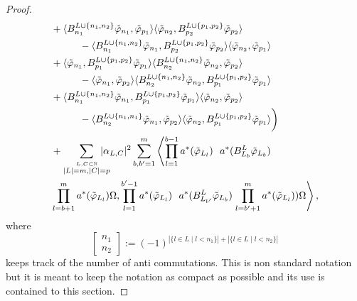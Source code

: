 \documentclass[b5paper,draft,openbib,12pt]{memoir}
\begin{document}
\begin{proof}
\begin{align}
  &+\langle B^{L\cup\{n_1,n_2\}}_{n_1}\tilde{\varphi}_{n_1},\tilde{\varphi}_{p_1} \rangle \langle  \tilde{\varphi}_{n_2}, B^{L\cup\{p_1,p_2\}}_{p_2}\tilde{\varphi}_{p_2}\rangle\\
  &\hspace{1cm}-\langle B^{L\cup\{n_1,n_2\}}_{n_1} \tilde{\varphi}_{n_1},B^{L\cup\{p_1,p_2\}}_{p_2}\tilde{\varphi}_{p_2} \rangle \langle  \tilde{\varphi}_{n_2}, \tilde{\varphi}_{p_1}\rangle \\
  & +\langle \tilde{\varphi}_{n_1},B^{L\cup\{p_1,p_2\}}_{p_1}\tilde{\varphi}_{p_1} \rangle \langle B^{L\cup\{n_1,n_2\}}_{n_2} \tilde{\varphi}_{n_2}, \tilde{\varphi}_{p_2}\rangle\\
  &\hspace{1cm}-\langle \tilde{\varphi}_{n_1},\tilde{\varphi}_{p_2} \rangle \langle B^{L\cup\{n_1,n_2\}}_{n_2} \tilde{\varphi}_{n_2},B^{L\cup\{p_1,p_2\}}_{p_1} \tilde{\varphi}_{p_1}\rangle \\
  & +\langle B^{L\cup\{n_1,n_2\}}_{n_1} \tilde{\varphi}_{n_1},B^{L\cup\{p_1,p_2\}}_{p_1}\tilde{\varphi}_{p_1} \rangle \langle  \tilde{\varphi}_{n_2}, \tilde{\varphi}_{p_2}\rangle\\
  &\hspace{1cm}-\langle B^{L\cup\{n_1,n_1\}}_{n_2} \tilde{\varphi}_{n_1},\tilde{\varphi}_{p_2} \rangle \langle  \tilde{\varphi}_{n_2},B^{L\cup\{p_1,p_2\}}_{p_1} \tilde{\varphi}_{p_1}\rangle \bigg)\\
&+\sum_{\overset{L,C\subset \mathbb{N}}{|L|=m,|C|=p}}\hspace{-0.4cm} |\alpha_{L,C}|^2
 \sum_{b,b'=1}^m 
\left\langle \prod_{l=1}^{b-1} a^*(\tilde{\varphi}_{L_l})  ~~ a^*(B^{L}_{L_b} \tilde{\varphi}_{L_b})\right.  \\\nonumber
&\prod_{l=b+1}^m a^*(\tilde{\varphi}_{L_l}) \Omega, 
\prod_{l=1}^{b'-1} a^*(\tilde{\varphi}_{L_l})  ~~ a^*(B_{L_{b'}}^{L} \tilde{\varphi}_{L_b})  \left.\prod_{l=b'+1}^m a^*(\tilde{\varphi}_{L_l}) ) \Omega\right\rangle,
\end{align}
where 
\begin{equation}
\left[\begin{matrix}n_1\\n_2\end{matrix}\right]:=(-1)^{|\{l\in L \mid l<n_1\}|+|\{l\in L \mid l<n_2\}|}
\end{equation} 
keeps track of the number of anti commutations. This is 
non standard notation but it is meant to keep the notation
as compact as possible and its use is 
contained to this section.


\end{proof}
\end{document}
